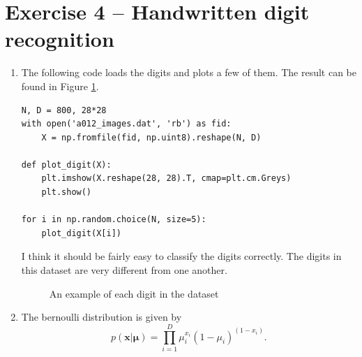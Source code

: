 \documentclass[a4paper]{article}
\begin{document}
\section*{Exercise 4 -- Handwritten digit recognition} %
\begin{enumerate}
\item The following code loads the digits and plots a few of them. The result can be found in Figure \ref{fig:digits}.
\begin{lstlisting}
N, D = 800, 28*28
with open('a012_images.dat', 'rb') as fid:
    X = np.fromfile(fid, np.uint8).reshape(N, D)

def plot_digit(X):
    plt.imshow(X.reshape(28, 28).T, cmap=plt.cm.Greys)
    plt.show()

for i in np.random.choice(N, size=5):
    plot_digit(X[i])
\end{lstlisting}
I think it should be fairly easy to classify the digits correctly. The digits in this dataset are very different from one another.
\begin{figure}
\centering
{}
\caption{An example of each digit in the dataset}
\label{fig:digits}
\end{figure}
\item The bernoulli distribution is given by
\begin{equation}
p(\bm{x}|\bm{\mu}) = \prod_{i=1}^D\mu_i^{x_i}(1 - \mu_i)^{(1 - x_i)}.
\end{equation}


\end{enumerate}
\end{document}

